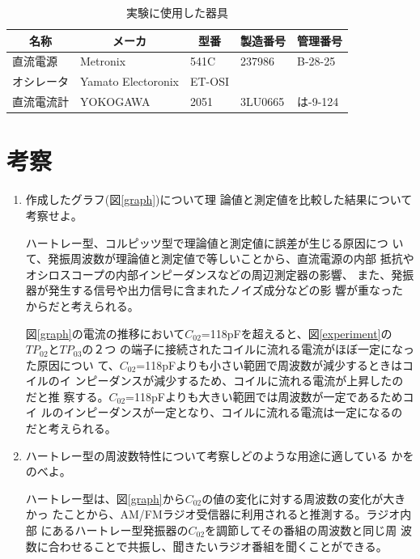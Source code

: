 \documentclass[a4paper,uplatex]{jsarticle}
\begin{document}
\begin{table}[]
	\centering
	\caption{実験に使用した器具}
	\label{tools}
	\begin{tabular}{|l|l|l|l|l|}
		\hline
		\multicolumn{1}{|c|}{名称} & \multicolumn{1}{c|}{メーカ} & \multicolumn{1}{c|}{型番} & \multicolumn{1}{c|}{製造番号} & \multicolumn{1}{c|}{管理番号} \\ \hline
		直流電源                     & Metronix                 & 541C                    & 237986                    & B-28-25                   \\ \hline
		オシレータ                    & Yamato Electoronix       & ET-OSI                  &                           &                           \\ \hline
		直流電流計                    & YOKOGAWA                 & 2051                    & 3LU0665                   & は-9-124                   \\ \hline
	\end{tabular}
\end{table}

\section{考察}

\begin{enumerate}
 \item 作成したグラフ(図\ref{graph})について理
       論値と測定値を比較した結果について考察せよ。

       ハートレー型、コルピッツ型で理論値と測定値に誤差が生じる原因につ
       いて、発振周波数が理論値と測定値で等しいことから、直流電源の内部
       抵抗やオシロスコープの内部インピーダンスなどの周辺測定器の影響、
       また、発振器が発生する信号や出力信号に含まれたノイズ成分などの影
       響が重なったからだと考えられる。

       図\ref{graph}の電流の推移において$C_{02}$=118pFを超えると、図\ref{experiment}の$TP_{02}$と$TP_{03}$の２つ
       の端子に接続されたコイルに流れる電流がほぼ一定になった原因につい
       て、$C_{02}$=118pFよりも小さい範囲で周波数が減少するときはコイルのイ
       ンピーダンスが減少するため、コイルに流れる電流が上昇したのだと推
       察する。$C_{02}$=118pFよりも大きい範囲では周波数が一定であるためコイ
       ルのインピーダンスが一定となり、コイルに流れる電流は一定になるの
       だと考えられる。

 \item ハートレー型の周波数特性について考察しどのような用途に適している
       かをのべよ。

       ハートレー型は、図\ref{graph}から$C_{02}$の値の変化に対する周波数の変化が大きかっ
       たことから、AM/FMラジオ受信器に利用されると推測する。ラジオ内部
       にあるハートレー型発振器の$C_{02}$を調節してその番組の周波数と同じ周
       波数に合わせることで共振し、聞きたいラジオ番組を聞くことができる。
\end{enumerate}
\end{document}
